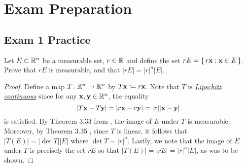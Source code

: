 \section{Exam Preparation}
\subsection{Exam 1 Practice}
\begin{problem}
Let $E\subset\mathbb{R}^n$ be a measurable set, $r\in\mathbb{R}$ and define the set
$rE=\left\{\,r\mathbf{x}:\mathbf{x}\in E\,\right\}$. Prove that $rE$ is
measurable, and that $|rE|=|r|^n|E|$.
\end{problem}
\begin{proof}
Define a map $T\colon\mathbb{R}^n\to\mathbb{R}^n$ by $T\mathbf{x}\coloneq r\mathbf{x}$. Note
that $T$ is
\href{https://en.wikipedia.org/wiki/Lipschitz_continuity}{\emph{Lipschitz
    continuous}} since for any $\mathbf{x},\mathbf{y}\in\mathbb{R}^n$, the equality
\begin{equation}
\label{eq:prep:1:1}
|T\mathbf{x}-T\mathbf{y}|=|r\mathbf{x}-r\mathbf{y}|=|r||\mathbf{x}-\mathbf{y}|
\end{equation}
is satisfied. By Theorem 3.33 from \cite[Ch.\@ 3, p.\@55]{wheeden-zygmund},
the image of $E$ under $T$ is measurable. Moreover, by Theorem 3.35
\cite[Ch.\@ 3, p.\@ 56]{wheeden-zygmund}, since $T$ is linear, it follows
that $|T(E)|=|{\det T}||E|$ where $\det T=|r|^n$. Lastly, we note that the
image of $E$ under $T$ is precisely the set $rE$ so that
$|T(E)|=|rE|=|r|^n|E|$, as was to be shown.
\end{proof}

